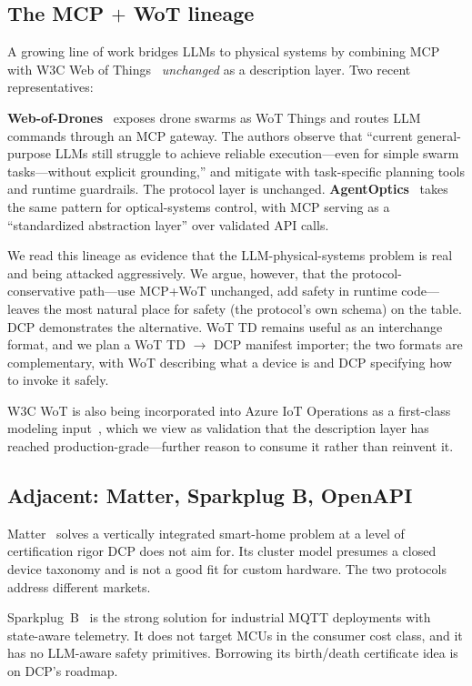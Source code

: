 \documentclass[11pt,a4paper]{article}
\begin{document}
\subsection{The MCP $+$ WoT lineage}

A growing line of work bridges LLMs to physical systems by combining MCP
with W3C Web of Things~\cite{wot_td_2025} \emph{unchanged} as a description
layer. Two recent representatives:

\textbf{Web-of-Drones}~\cite{web_of_drones} exposes drone swarms as WoT
Things and routes LLM commands through an MCP gateway. The authors observe
that ``current general-purpose LLMs still struggle to achieve reliable
execution---even for simple swarm tasks---without explicit grounding,'' and
mitigate with task-specific planning tools and runtime guardrails. The
protocol layer is unchanged. \textbf{AgentOptics}~\cite{agentoptics} takes
the same pattern for optical-systems control, with MCP serving as a
``standardized abstraction layer'' over validated API calls.

We read this lineage as evidence that the LLM-physical-systems problem is
real and being attacked aggressively. We argue, however, that the
protocol-conservative path---use MCP+WoT unchanged, add safety in runtime
code---leaves the most natural place for safety (the protocol's own
schema) on the table. DCP demonstrates the alternative. WoT TD remains
useful as an interchange format, and we plan a WoT TD $\to$ DCP manifest
importer; the two formats are complementary, with WoT describing what a
device is and DCP specifying how to invoke it safely.

W3C WoT is also being incorporated into Azure IoT Operations as a
first-class modeling input~\cite{azure_wot_2025}, which we view as
validation that the description layer has reached
production-grade---further reason to consume it rather than reinvent it.

\subsection{Adjacent: Matter, Sparkplug B, OpenAPI}

Matter~\cite{matter_spec} solves a vertically integrated smart-home
problem at a level of certification rigor DCP does not aim for. Its
cluster model presumes a closed device taxonomy and is not a good fit for
custom hardware. The two protocols address different markets.

Sparkplug~B~\cite{sparkplug} is the strong solution for industrial MQTT
deployments with state-aware telemetry. It does not target MCUs in the
consumer cost class, and it has no LLM-aware safety primitives. Borrowing
its birth/death certificate idea is on DCP's roadmap.
\end{document}
